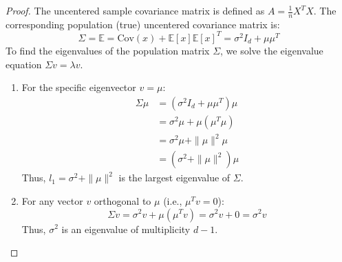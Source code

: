 \documentclass[11pt, a4paper]{article}
\begin{document}
\begin{proof}
The uncentered sample covariance matrix is defined as $A = \frac{1}{n} X^T X$. The corresponding population (true) uncentered covariance matrix is:
\begin{equation}
    \Sigma = \mathbb{E} = \text{Cov}(x) + \mathbb{E}[x]\mathbb{E}[x]^T = \sigma^2 I_d + \mu \mu^T
\end{equation}
To find the eigenvalues of the population matrix $\Sigma$, we solve the eigenvalue equation $\Sigma v = \lambda v$. 
\begin{enumerate}
    \item For the specific eigenvector $v = \mu$:
    \begin{align}
        \Sigma \mu &= (\sigma^2 I_d + \mu \mu^T) \mu \\
                   &= \sigma^2 \mu + \mu (\mu^T \mu) \\
                   &= \sigma^2 \mu + \|\mu\|^2 \mu \\
                   &= (\sigma^2 + \|\mu\|^2) \mu
    \end{align}
    Thus, $l_1 = \sigma^2 + \|\mu\|^2$ is the largest eigenvalue of $\Sigma$.
    \item For any vector $v$ orthogonal to $\mu$ (i.e., $\mu^T v = 0$):
    \begin{equation}
        \Sigma v = \sigma^2 v + \mu (\mu^T v) = \sigma^2 v + 0 = \sigma^2 v
    \end{equation}
    Thus, $\sigma^2$ is an eigenvalue of multiplicity $d - 1$.
\end{enumerate}


\end{proof}
\end{document}

